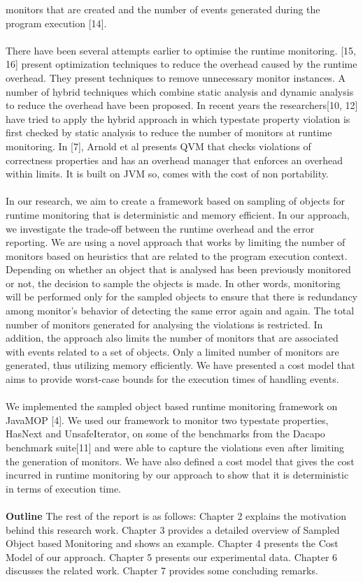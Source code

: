 {monitors that are created and the number of events generated during the program 
execution [14].\\\\
There have been several attempts earlier to optimise the runtime monitoring. 
[15, 16] present optimization techniques to reduce the overhead caused by the 
runtime overhead. They present techniques to remove unnecessary monitor 
instances. A number of hybrid techniques which combine static analysis and 
dynamic analysis to reduce the overhead have been proposed. In recent years the 
researchers[10, 12] have tried to apply the hybrid approach in which typestate 
property violation is first checked by static analysis to reduce the number of 
monitors at runtime monitoring. In [7], Arnold et al presents QVM that checks 
violations of correctness properties and has an overhead manager that enforces 
an overhead within limits. It is built on JVM so, comes with the cost of non 
portability.\\\\ 
In our research, we aim to create a framework based on sampling of objects for 
runtime monitoring that is deterministic and memory efficient. In our approach, 
we investigate the trade-off between the runtime overhead and the error 
reporting.  We are using a novel approach that works by limiting the number of 
monitors based on heuristics that are related to the program execution context. 
Depending on whether an object that is analysed has been previously monitored or 
not, the decision to sample the objects is made. In other words, monitoring will 
be performed only for the sampled objects to ensure that there is  redundancy 
among monitor's behavior of detecting the same error again and again. The total 
number of monitors generated for analysing the violations is restricted. In 
addition, the approach also limits the number of monitors that are associated 
with events related to a set of objects. Only a limited number of monitors are 
generated, thus utilizing memory efficiently. We have presented a cost model 
that aims to provide worst-case bounds for the execution times of handling 
events.\\\\
We implemented the sampled object based runtime monitoring framework on JavaMOP 
[4]. We used our framework to monitor two typestate properties, HasNext and 
UnsafeIterator, on some of the benchmarks from the Dacapo benchmark suite[11] 
and were able to capture the violations even after limiting the generation of 
monitors. We have also defined a cost model that gives the cost incurred in 
runtime monitoring by our approach to show that it is deterministic in terms of 
execution time.\\\\
\textbf{Outline} The rest of the report is as follows: Chapter 2 explains the 
motivation behind this research work. Chapter 3 provides a detailed overview of 
Sampled Object based Monitoring and shows an example. Chapter 4 presents the 
Cost Model of our approach. Chapter 5 presents our experimental data. Chapter 6 
discusses the related work. Chapter 7 provides some concluding remarks.
}